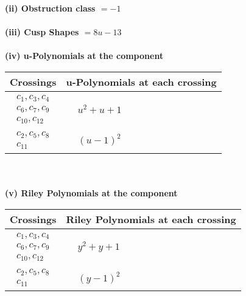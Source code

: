 \documentclass[1p]{elsarticle_modified}
\theoremstyle{definition}
\begin{document}
\flushleft \textbf{(ii) Obstruction class $= -1$}\\~\\
\flushleft \textbf{(iii) Cusp Shapes $= 8 u-13$}\\~\\
\newpage\renewcommand{\arraystretch}{1}
\flushleft \textbf{(iv) u-Polynomials at the component}\newline \\
\begin{tabular}{m{50pt}|m{274pt}}
Crossings & \hspace{64pt}u-Polynomials at each crossing \\
\hline $$\begin{aligned}c_{1},c_{3},c_{4}\\c_{6},c_{7},c_{9}\\c_{10},c_{12}\end{aligned}$$&$\begin{aligned}
&u^2+u+1
\end{aligned}$\\
\hline $$\begin{aligned}c_{2},c_{5},c_{8}\\c_{11}\end{aligned}$$&$\begin{aligned}
&(u-1)^2
\end{aligned}$\\
\hline
\end{tabular}\\~\\
\newpage\renewcommand{\arraystretch}{1}
\flushleft \textbf{(v) Riley Polynomials at the component}\newline \\
\begin{tabular}{m{50pt}|m{274pt}}
Crossings & \hspace{64pt}Riley Polynomials at each crossing \\
\hline $$\begin{aligned}c_{1},c_{3},c_{4}\\c_{6},c_{7},c_{9}\\c_{10},c_{12}\end{aligned}$$&$\begin{aligned}
&y^2+y+1
\end{aligned}$\\
\hline $$\begin{aligned}c_{2},c_{5},c_{8}\\c_{11}\end{aligned}$$&$\begin{aligned}
&(y-1)^2
\end{aligned}$\\
\hline
\end{tabular}\\~\\
\end{document}

